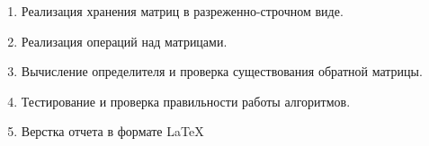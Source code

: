 \begin{enumerate}
	\item Реализация хранения матриц в разреженно-строчном виде.
	\item Реализация операций над матрицами.
	\item Вычисление определителя и проверка существования обратной матрицы.
	\item Тестирование и проверка правильности работы алгоритмов.
	\item Верстка отчета в формате \LaTeX
\end{enumerate}